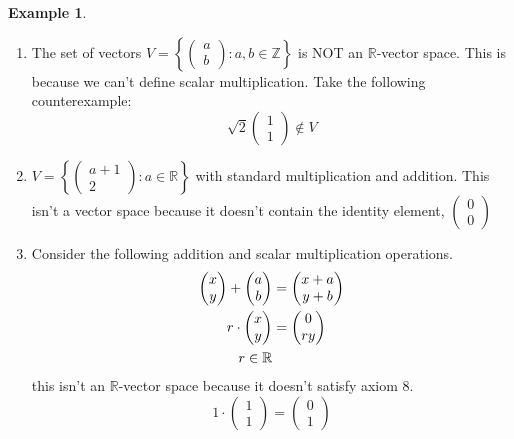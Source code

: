 \documentclass{report}
\theoremstyle{remark}
\theoremstyle{definition}
\theoremstyle{definition}
\newtheorem{example}[theorem]{Example}
\theoremstyle{theorem}
\begin{document}
\begin{example}
\begin{enumerate}
    \item The set of vectors $V = \left\{ \begin{pmatrix} a\\b \end{pmatrix}: a,b \in \mathbb{Z} \right\}$ is NOT an $\mathbb{R}$-vector space. This is because we can't define scalar multiplication. Take the following counterexample:
    \[ \sqrt{2} \begin{pmatrix} 1\\1\end{pmatrix} \notin V\]
    \item $V = \left\{ \begin{pmatrix} a+1\\2 \end{pmatrix}: a \in \mathbb{R} \right\}$ with standard multiplication and addition. This isn't a vector space because it doesn't contain the identity element, $\begin{pmatrix}0\\0\end{pmatrix}$
    \item Consider the following addition and scalar multiplication operations.
    \begin{align}
        \begin{pmatrix}x\\y\end{pmatrix} + \begin{pmatrix} a\\b \end{pmatrix} &= \begin{pmatrix}x+a \\ y+b \end{pmatrix}\\
        r \cdot \begin{pmatrix}x\\y \end{pmatrix} &= \begin{pmatrix}0\\ry\end{pmatrix}\\
        r \in \mathbb{R} \notag
    \end{align}
    this isn't an $\mathbb{R}$-vector space because it doesn't satisfy axiom 8.
    \[1 \cdot \begin{pmatrix}1\\1\end{pmatrix} = \begin{pmatrix} 0\\1 \end{pmatrix} \]
\end{enumerate}
\end{example}
\end{document}
